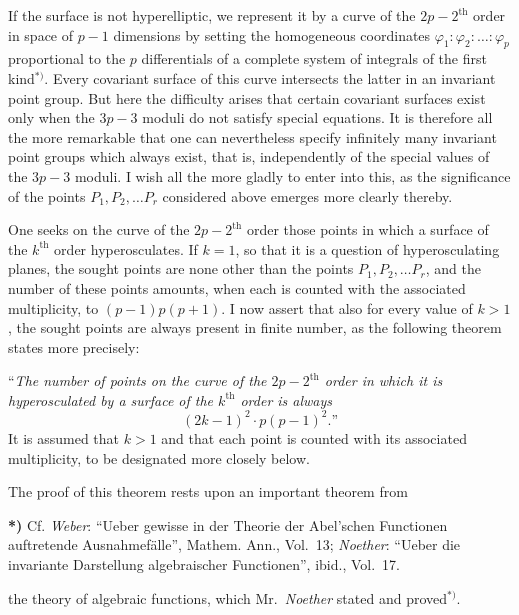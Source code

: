 \documentclass{article}
\begin{document}
If the surface is not hyperelliptic, we represent it by a curve of the $2p-2^{\text{th}}$ order in space of $p-1$ dimensions by setting the homogeneous coordinates $\varphi_1 : \varphi_2 : \dots : \varphi_p$ proportional to the $p$ differentials of a complete system of integrals of the first kind${}^{*)}$. Every covariant surface of this curve intersects the latter in an invariant point group. But here the difficulty arises that certain covariant surfaces exist only when the $3p-3$ moduli do not satisfy special equations. It is therefore all the more remarkable that one can nevertheless specify infinitely many invariant point groups which always exist, that is, independently of the special values of the $3p-3$ moduli. I wish all the more gladly to enter into this, as the significance of the points $P_1, P_2, \dots P_r$ considered above emerges more clearly thereby.

One seeks on the curve of the $2p-2^{\text{th}}$ order those points in which a surface of the $k^{\text{th}}$ order hyperosculates. If $k = 1$, so that it is a question of hyperosculating planes, the sought points are none other than the points $P_1, P_2, \dots P_r$, and the number of these points amounts, when each is counted with the associated multiplicity, to $(p-1)p(p+1)$. I now assert that also for every value of $k > 1$, the sought points are always present in finite number, as the following theorem states more precisely:

``\emph{The number of points on the curve of the $2p-2^{\text{th}}$ order in which it is hyperosculated by a surface of the $k^{\text{th}}$ order is always}
\[
(2k-1)^2 \cdot p(p-1)^2.\text{''}
\]
It is assumed that $k > 1$ and that each point is counted with its associated multiplicity, to be designated more closely below.

The proof of this theorem rests upon an important theorem from

\textbf{*)} Cf. \emph{Weber}: ``Ueber gewisse in der Theorie der Abel'schen Functionen auftretende Ausnahmefälle'', Mathem. Ann., Vol.~13; \emph{Noether}: ``Ueber die invariante Darstellung algebraischer Functionen'', ibid., Vol.~17.

the theory of algebraic functions, which Mr.~\emph{Noether} stated and proved${}^{*)}$.
\end{document}
